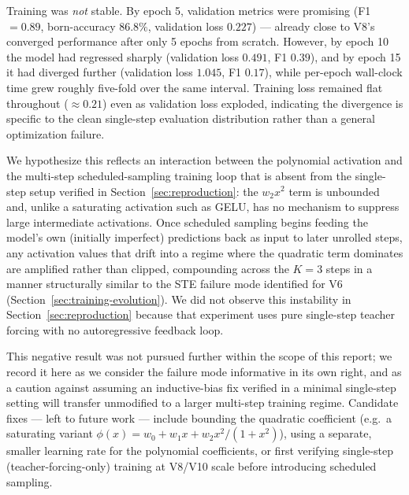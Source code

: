 Training was \emph{not} stable. By epoch 5, validation metrics were
promising (F1 $=0.89$, born-accuracy $86.8\%$, validation loss $0.227$) ---
already close to V8's converged performance after only 5 epochs from
scratch. However, by epoch 10 the model had regressed sharply (validation
loss $0.491$, F1 $0.39$), and by epoch 15 it had diverged further
(validation loss $1.045$, F1 $0.17$), while per-epoch wall-clock time grew
roughly five-fold over the same interval. Training loss remained flat
throughout ($\approx 0.21$) even as validation loss exploded, indicating
the divergence is specific to the clean single-step evaluation distribution
rather than a general optimization failure.

We hypothesize this reflects an interaction between the polynomial
activation and the multi-step scheduled-sampling training loop that is
absent from the single-step setup verified in
Section~\ref{sec:reproduction}: the $w_2 x^2$ term is unbounded and,
unlike a saturating activation such as GELU, has no mechanism to suppress
large intermediate activations. Once scheduled sampling begins feeding the
model's own (initially imperfect) predictions back as input to later
unrolled steps, any activation values that drift into a regime where the
quadratic term dominates are amplified rather than clipped, compounding
across the $K=3$ steps in a manner structurally similar to the STE failure
mode identified for V6 (Section~\ref{sec:training-evolution}). We did not
observe this instability in Section~\ref{sec:reproduction} because that
experiment uses pure single-step teacher forcing with no autoregressive
feedback loop.

This negative result was not pursued further within the scope of this
report; we record it here as we consider the failure mode informative in
its own right, and as a caution against assuming an inductive-bias fix
verified in a minimal single-step setting will transfer unmodified to a
larger multi-step training regime. Candidate fixes --- left to future work
--- include bounding the quadratic coefficient (e.g.\ a saturating variant
$\phi(x) = w_0 + w_1 x + w_2 x^2/(1+x^2)$), using a separate, smaller
learning rate for the polynomial coefficients, or first verifying
single-step (teacher-forcing-only) training at V8/V10 scale before
introducing scheduled sampling.
